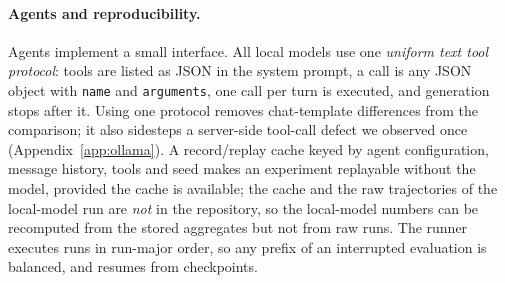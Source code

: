 \paragraph{Agents and reproducibility.} Agents implement a small interface. All local models use one \emph{uniform text tool protocol}: tools are listed as JSON in the system prompt, a call is any JSON object with \texttt{name} and \texttt{arguments}, one call per turn is executed, and generation stops after it. Using one protocol removes chat-template differences from the comparison; it also sidesteps a server-side tool-call defect we observed once (Appendix~\ref{app:ollama}). A record/replay cache keyed by agent configuration, message history, tools and seed makes an experiment replayable without the model, provided the cache is available; the cache and the raw trajectories of the local-model run are \emph{not} in the repository, so the local-model numbers can be recomputed from the stored aggregates but not from raw runs. The runner executes runs in run-major order, so any prefix of an interrupted evaluation is balanced, and resumes from checkpoints.
